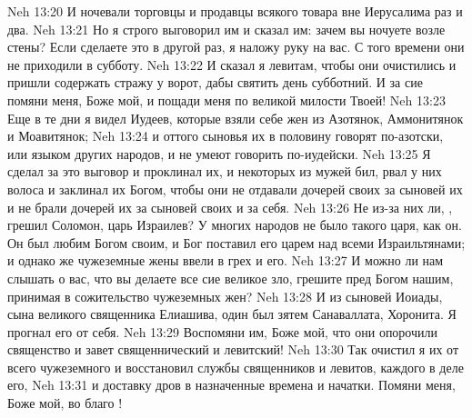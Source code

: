 \vs Neh 13:20 И ночевали торговцы и продавцы всякого товара вне Иерусалима раз и два.
\vs Neh 13:21 Но я строго выговорил им и сказал им: зачем вы ночуете возле стены? Если сделаете это в другой раз, я наложу руку на вас. С того времени они не приходили в субботу.
\vs Neh 13:22 И сказал я левитам, чтобы они очистились и пришли содержать стражу у ворот, дабы святить день субботний. И за сие помяни меня, Боже мой, и пощади меня по великой милости Твоей!
\rsbpar\vs Neh 13:23 Еще в те дни я видел Иудеев, которые взяли себе жен из Азотянок, Аммонитянок и Моавитянок;
\vs Neh 13:24 и оттого сыновья их в половину говорят по-азотски, или языком других народов, и не умеют говорить по-иудейски.
\vs Neh 13:25 Я сделал за это выговор и проклинал их, и некоторых из мужей бил, рвал у них волоса и заклинал их Богом, чтобы они не отдавали дочерей своих за сыновей их и не брали дочерей их за сыновей своих и за себя.
\vs Neh 13:26 Не из-за них ли, , грешил Соломон, царь Израилев? У многих народов не было такого царя, как он. Он был любим Богом своим, и Бог поставил его царем над всеми Израильтянами; и однако же чужеземные жены ввели в грех и его.
\vs Neh 13:27 И можно ли нам слышать о вас, что вы делаете все сие великое зло, грешите пред Богом нашим, принимая в сожительство чужеземных жен?
\vs Neh 13:28 И из сыновей Иоиады, сына великого священника Елиашива, один был зятем Санаваллата, Хоронита. Я прогнал его от себя.
\vs Neh 13:29 Воспомяни им, Боже мой, что они опорочили священство и завет священнический и левитский!
\rsbpar\vs Neh 13:30 Так очистил я их от всего чужеземного и восстановил службы священников и левитов, каждого в деле его,
\vs Neh 13:31 и доставку дров в назначенные времена и начатки. Помяни меня, Боже мой, во благо !
